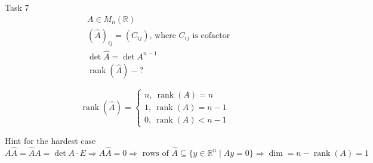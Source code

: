\documentclass[fullscreen=true, bookmarks=true, hyperref={pdfencoding=unicode}]{beamer}
\begin{document}
\begin{frame}{Task 7}
  \begin{align*}
    &A \in M_n(\mathbb{R}) \\
    &(\widehat{A})_{ij} = (C_{ij}) \text{, where } C_{ij} \text{ is cofactor} \\
    & \det \widehat{A} = \det A ^ {n-1} \\
    & \operatorname{rank}(\widehat{A}) - ?
  \end{align*}
 
  \pause
  $$\operatorname{rank}(\widehat{A}) = 
  \begin{cases}
    n,\ \operatorname{rank}(A) = n \\
    1,\ \operatorname{rank}(A) = n-1 \\
    0,\ \operatorname{rank}(A) < n-1
  \end{cases}$$

  \pause
  \begin{block}{Hint for the hardest case}
    $A \widehat{A} = \widehat{A} A = \det A \cdot E \Rightarrow A \widehat{A} = 0
    \Rightarrow \text{ rows of } \widehat{A} \subseteq \{y \in \mathbb{R}^n \mid Ay = 0\}
    \Rightarrow \dim = n - \operatorname{rank}(A) = 1$
  \end{block}

\end{frame}
\end{document}
